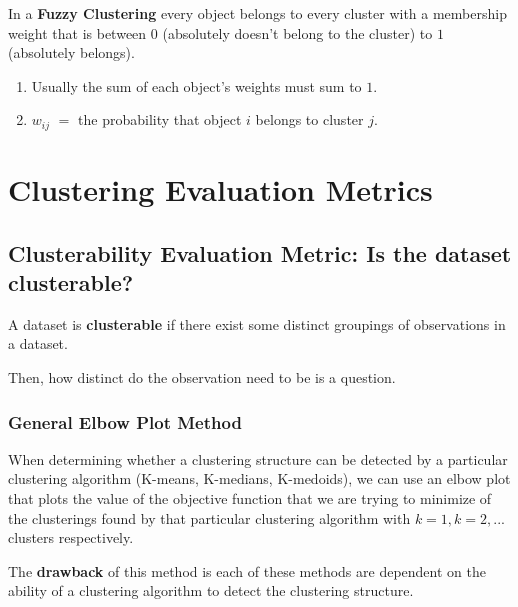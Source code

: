 \documentclass[11pt]{elegantbook}
\begin{document}
\begin{definition}
    In a \textbf{Fuzzy Clustering} every object belongs to every cluster with a membership weight that is between $0$ (absolutely doesn't belong to the cluster) to $1$ (absolutely belongs).
    \begin{enumerate}
        \item Usually the sum of each object's weights must sum to $1$.
        \item $w_{ij}$ $=$ the probability that object $i$ belongs to cluster $j$.
    \end{enumerate}
\end{definition}








\chapter{Clustering Evaluation Metrics}
\section{Clusterability Evaluation Metric: Is the dataset clusterable?}
\begin{definition}
    A dataset is \textbf{clusterable} if there exist some distinct groupings of observations in a dataset.
\end{definition}
Then, how distinct do the observation need to be is a question.

\subsection{General Elbow Plot Method}
When determining whether a clustering structure can be detected by a particular clustering algorithm (K-means, K-medians, K-medoids), we can use an elbow plot that plots the value of the objective function that we are trying to minimize of the clusterings found by that particular clustering algorithm with $k=1,k=2,...$ clusters respectively.

The \textbf{drawback} of this method is each of these methods are dependent on the ability of a clustering algorithm to detect the clustering structure.
\end{document}
